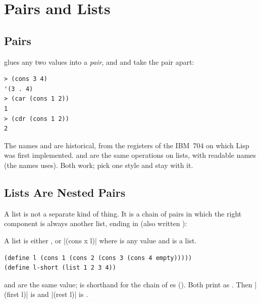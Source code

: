 \section{Pairs and Lists}
\label{sec:lists}

\subsection{Pairs}

 glues any two values into a \emph{pair}, and  and  take the pair apart:
\begin{lstlisting}[style=repl]
> (cons 3 4)
'(3 . 4)
> (car (cons 1 2))
1
> (cdr (cons 1 2))
2
\end{lstlisting}
The names  and  are historical, from the registers of the IBM~704 on which Lisp was first implemented.  and  are the same operations on lists, with readable names (the names \cite{HtDP} uses). Both work; pick one style and stay with it.

\subsection{Lists Are Nested Pairs}

A list is not a separate kind of thing. It is a chain of pairs in which the right component is always another list, ending in  (also written ):

\begin{definition}[List]
A list is either , or \rkt|(cons x l)| where  is any value and  is a list.
\end{definition}

\begin{lstlisting}
(define l (cons 1 (cons 2 (cons 3 (cons 4 empty)))))
(define l-short (list 1 2 3 4))
\end{lstlisting}
 and  are the same value;  is shorthand for the chain of es (). Both print as . Then \rkt|(first l)| is  and \rkt|(rest l)| is .

